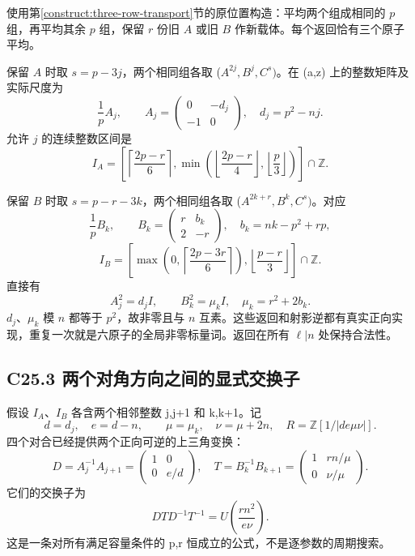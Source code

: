 {使用}第\ref{construct:three-row-transport}节{的原位置构造：平均两个组成相同的} {\ensuremath{p}} {组，再平均其余} {\ensuremath{p}} {组，保留} {\ensuremath{r}} {份旧} {\ensuremath{A}} {或旧} {\ensuremath{B}} {作新载体。每个返回恰有三个原子平均。}

{保留} {\ensuremath{A}} {时取} {\ensuremath{s=p-3j}，两个相同组各取} {(\ensuremath{A^{2j},B^{j},C^{s})}。在} {(a,z)} {上的整数矩阵及实际尺度为} \[
\frac1p A_j,\qquad
A_j=\begin{pmatrix}0&-d_j\\-1&0\end{pmatrix},
\quad d_j=p^2-nj.
\tag{C25.2}
\] {允许} {\ensuremath{j}} {的连续整数区间是} \[
I_A=\left[
\left\lceil\frac{2p-r}{6}\right\rceil,
\min\left(\left\lfloor\frac{2p-r}{4}\right\rfloor,
\left\lfloor\frac p3\right\rfloor\right)\right]\cap\mathbb Z.
\tag{C25.3}
\]

{保留} {\ensuremath{B}} {时取} {\ensuremath{s=p-r-3k}，两个相同组各取} {(\ensuremath{A^{2k+r},B^{k},C^{s})}。对应} \[
\frac1p B_k,\qquad
B_k=\begin{pmatrix}r&b_k\\2&-r\end{pmatrix},
\quad b_k=nk-p^2+rp,
\tag{C25.4}
\] \[
I_B=\left[
\max\left(0,\left\lceil\frac{2p-3r}{6}\right\rceil\right),
\left\lfloor\frac{p-r}{3}\right\rfloor\right]\cap\mathbb Z.
\tag{C25.5}
\] {直接有} \[
A_j^2=d_j I,\qquad B_k^2=\mu_k I,
\quad \mu_k=r^2+2b_k.
\] {\ensuremath{d_{j}}、\ensuremath{\mu _{k}}} {模} {\ensuremath{n}} {都等于} {\ensuremath{p^{2}}，故非零且与} {\ensuremath{n}} {互素。这些返回和射影逆都有真实正向实现，重复一次就是六原子的全局非零标量词。返回在所有} {\ensuremath{\ell |n}} {处保持合法性。}

\subsection*{\texorpdfstring{{C25.3} {两个对角方向之间的显式交换子}}{C25.3 两个对角方向之间的显式交换子}}\label{C25-h156}

{假设} {\ensuremath{I_{A}}、\ensuremath{I_{B}}} {各含两个相邻整数} {j,j+1} {和} {k,k+1。记} \[
d=d_j,\quad e=d-n,\qquad
\mu=\mu_k,\quad\nu=\mu+2n,
\quad R=\mathbb Z[1/|de\mu\nu|].
\] {四个对合已经提供两个正向可逆的上三角变换：} \[
D=A_j^{-1}A_{j+1}
=\begin{pmatrix}1&0\\0&e/d\end{pmatrix},
\quad
T=B_k^{-1}B_{k+1}
=\begin{pmatrix}1&rn/\mu\\0&\nu/\mu\end{pmatrix}.
\tag{C25.6}
\] {它们的交换子为} \[
\boxed{DTD^{-1}T^{-1}=U\left(\frac{rn^2}{e\nu}\right).}
\tag{C25.7}
\] {这是一条对所有满足容量条件的} {p,r} {恒成立的公式，不是逐参数的周期搜索。}

